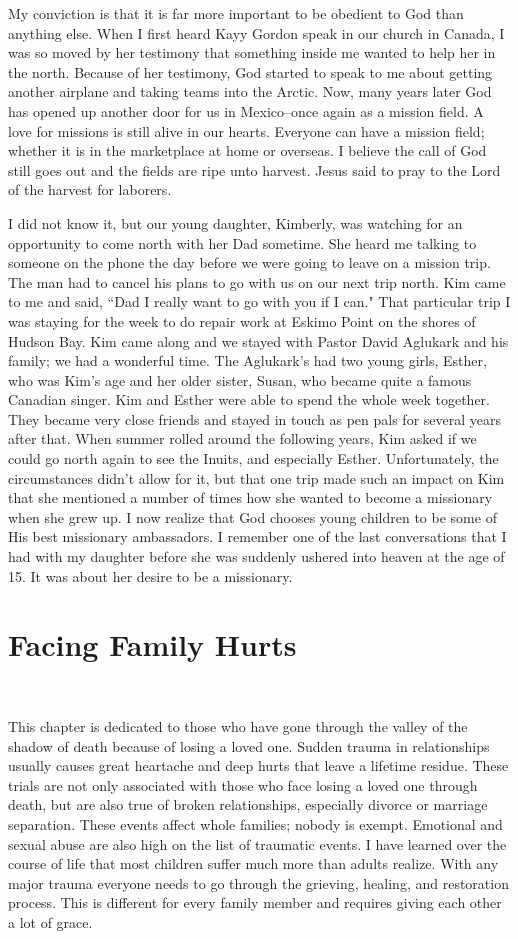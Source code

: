 \documentclass[oneside]{book}
\begin{document}
My conviction is that it is far more important to be obedient to God than anything else. When I first heard Kayy Gordon speak in our church in Canada, I was so moved by her testimony that something inside me wanted to help her in the north. Because of her testimony, God started to speak to me about getting another airplane and taking teams into the Arctic. Now, many years later God has opened up another door for us in Mexico--once again as a mission field. A love for missions is still alive in our hearts. Everyone can have a mission field; whether it is in the marketplace at home or overseas. I believe the call of God still goes out and the fields are ripe unto harvest. Jesus said to pray to the Lord of the harvest for laborers.

I did not know it, but our young daughter, Kimberly, was watching for an opportunity to come north with her Dad sometime. She heard me talking to someone on the phone the day before we were going to leave on a mission trip. The man had to cancel his plans to go with us on our next trip north. Kim came to me and said, ``Dad I really want to go with you if I can." That particular trip I was staying for the week to do repair work at Eskimo Point on the shores of Hudson Bay. Kim came along and we stayed with Pastor David Aglukark and his family; we had a wonderful time. The Aglukark's had two young girls, Esther, who was Kim's age and her older sister, Susan, who became quite a famous Canadian singer. Kim and Esther were able to spend the whole week together. They became very close friends and stayed in touch as pen pals for several years after that. When summer rolled around the following years, Kim asked if we could go north again to see the Inuits, and especially Esther. Unfortunately, the circumstances didn't allow for it, but that one trip made such an impact on Kim that she mentioned a number of times how she wanted to become a missionary when she grew up. I now realize that God chooses young children to be some of His best missionary ambassadors. I remember one of the last conversations that I had with my daughter before she was suddenly ushered into heaven at the age of 15. It was about her desire to be a missionary.


\chapter{Facing Family Hurts}
\

This chapter is dedicated to those who have gone through the valley of the shadow of death because of losing a loved one. Sudden trauma in relationships usually causes great heartache and deep hurts that leave a lifetime residue. These trials are not only associated with those who face losing a loved one through death, but are also true of broken relationships, especially divorce or marriage separation. These events affect whole families; nobody is exempt. Emotional and sexual abuse are also high on the list of traumatic events. I have learned over the course of life that most children suffer much more than adults realize. With any major trauma everyone needs to go through the grieving, healing, and restoration process. This is different for every family member and requires giving each other a lot of grace.
\end{document}

